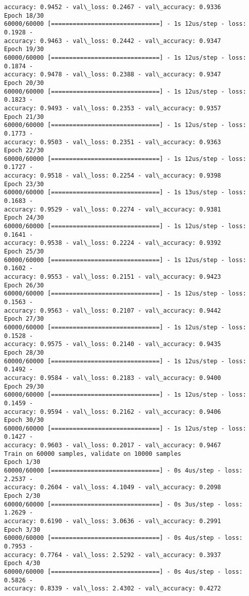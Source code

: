\documentclass[11pt]{article}
\begin{document}
\begin{Verbatim}[commandchars=\\\{\}]
accuracy: 0.9452 - val\_loss: 0.2467 - val\_accuracy: 0.9336
Epoch 18/30
60000/60000 [==============================] - 1s 12us/step - loss: 0.1928 -
accuracy: 0.9463 - val\_loss: 0.2442 - val\_accuracy: 0.9347
Epoch 19/30
60000/60000 [==============================] - 1s 12us/step - loss: 0.1874 -
accuracy: 0.9478 - val\_loss: 0.2388 - val\_accuracy: 0.9347
Epoch 20/30
60000/60000 [==============================] - 1s 12us/step - loss: 0.1823 -
accuracy: 0.9493 - val\_loss: 0.2353 - val\_accuracy: 0.9357
Epoch 21/30
60000/60000 [==============================] - 1s 12us/step - loss: 0.1773 -
accuracy: 0.9503 - val\_loss: 0.2351 - val\_accuracy: 0.9363
Epoch 22/30
60000/60000 [==============================] - 1s 12us/step - loss: 0.1727 -
accuracy: 0.9518 - val\_loss: 0.2254 - val\_accuracy: 0.9398
Epoch 23/30
60000/60000 [==============================] - 1s 13us/step - loss: 0.1683 -
accuracy: 0.9529 - val\_loss: 0.2274 - val\_accuracy: 0.9381
Epoch 24/30
60000/60000 [==============================] - 1s 12us/step - loss: 0.1641 -
accuracy: 0.9538 - val\_loss: 0.2224 - val\_accuracy: 0.9392
Epoch 25/30
60000/60000 [==============================] - 1s 12us/step - loss: 0.1602 -
accuracy: 0.9553 - val\_loss: 0.2151 - val\_accuracy: 0.9423
Epoch 26/30
60000/60000 [==============================] - 1s 12us/step - loss: 0.1563 -
accuracy: 0.9563 - val\_loss: 0.2107 - val\_accuracy: 0.9442
Epoch 27/30
60000/60000 [==============================] - 1s 12us/step - loss: 0.1528 -
accuracy: 0.9575 - val\_loss: 0.2140 - val\_accuracy: 0.9435
Epoch 28/30
60000/60000 [==============================] - 1s 12us/step - loss: 0.1492 -
accuracy: 0.9584 - val\_loss: 0.2183 - val\_accuracy: 0.9400
Epoch 29/30
60000/60000 [==============================] - 1s 12us/step - loss: 0.1459 -
accuracy: 0.9594 - val\_loss: 0.2162 - val\_accuracy: 0.9406
Epoch 30/30
60000/60000 [==============================] - 1s 12us/step - loss: 0.1427 -
accuracy: 0.9603 - val\_loss: 0.2017 - val\_accuracy: 0.9467
Train on 60000 samples, validate on 10000 samples
Epoch 1/30
60000/60000 [==============================] - 0s 4us/step - loss: 2.2537 -
accuracy: 0.2604 - val\_loss: 4.1049 - val\_accuracy: 0.2098
Epoch 2/30
60000/60000 [==============================] - 0s 3us/step - loss: 1.2629 -
accuracy: 0.6190 - val\_loss: 3.0636 - val\_accuracy: 0.2991
Epoch 3/30
60000/60000 [==============================] - 0s 4us/step - loss: 0.7953 -
accuracy: 0.7764 - val\_loss: 2.5292 - val\_accuracy: 0.3937
Epoch 4/30
60000/60000 [==============================] - 0s 4us/step - loss: 0.5826 -
accuracy: 0.8339 - val\_loss: 2.4302 - val\_accuracy: 0.4272

\end{Verbatim}
\end{document}
